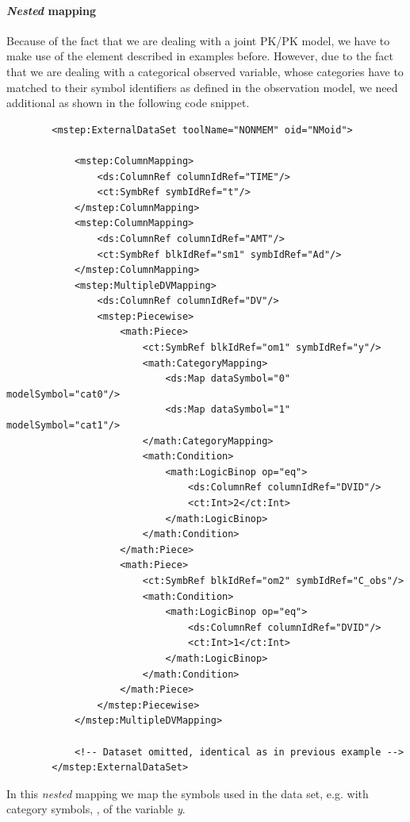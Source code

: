 \paragraph{\emph{Nested} mapping}
Because of the fact that we are dealing with a joint PK/PK model, we have to 
make use of the  element described in examples before.
However, due to the fact that we are dealing with a categorical observed variable, 
whose categories have to matched to their symbol identifiers as defined in the observation
model, we need additional  as shown in the following 
code snippet. 
\lstset{language=XML}
\begin{lstlisting}
        <mstep:ExternalDataSet toolName="NONMEM" oid="NMoid">
            
            <mstep:ColumnMapping>
                <ds:ColumnRef columnIdRef="TIME"/>
                <ct:SymbRef symbIdRef="t"/>
            </mstep:ColumnMapping>
            <mstep:ColumnMapping>
                <ds:ColumnRef columnIdRef="AMT"/>
                <ct:SymbRef blkIdRef="sm1" symbIdRef="Ad"/>
            </mstep:ColumnMapping>
            <mstep:MultipleDVMapping>
                <ds:ColumnRef columnIdRef="DV"/>
                <mstep:Piecewise>
                    <math:Piece>
                        <ct:SymbRef blkIdRef="om1" symbIdRef="y"/>
                        <math:CategoryMapping>
                            <ds:Map dataSymbol="0" modelSymbol="cat0"/>
                            <ds:Map dataSymbol="1" modelSymbol="cat1"/>
                        </math:CategoryMapping>
                        <math:Condition>
                            <math:LogicBinop op="eq">
                                <ds:ColumnRef columnIdRef="DVID"/>
                                <ct:Int>2</ct:Int>
                            </math:LogicBinop>
                        </math:Condition>
                    </math:Piece>
                    <math:Piece>
                        <ct:SymbRef blkIdRef="om2" symbIdRef="C_obs"/>
                        <math:Condition>
                            <math:LogicBinop op="eq">
                                <ds:ColumnRef columnIdRef="DVID"/>
                                <ct:Int>1</ct:Int>
                            </math:LogicBinop>
                        </math:Condition>
                    </math:Piece>
                </mstep:Piecewise>
            </mstep:MultipleDVMapping>
            
            <!-- Dataset omitted, identical as in previous example -->
        </mstep:ExternalDataSet>
\end{lstlisting}
In this \emph{nested} mapping we map the symbols used in the data set,
e.g.  with category symbols, ,
of the variable \emph{y}.


